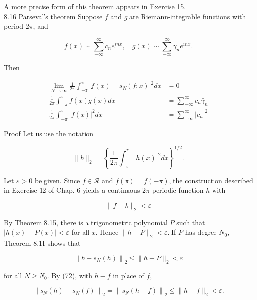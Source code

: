\documentclass[10pt]{article}
\begin{document}
A more precise form of this theorem appears in Exercise 15.\\
8.16 Parseval's theorem Suppose $f$ and $g$ are Riemann-integrable functions with period $2 \pi$, and


\begin{equation*}
f(x) \sim \sum_{-\infty}^{\infty} c_{n} e^{i n x}, \quad g(x) \sim \sum_{-\infty}^{\infty} \gamma_{n} e^{i n x} . \tag{82}
\end{equation*}


Then


\begin{align*}
\lim _{N \rightarrow \infty} \frac{1}{2 \pi} \int_{-\pi}^{\pi}\left|f(x)-s_{N}(f ; x)\right|^{2} d x & =0  \tag{83}\\
\frac{1}{2 \pi} \int_{-\pi}^{\pi} f(x) \overline{g(x)} d x & =\sum_{-\infty}^{\infty} c_{n} \bar{\gamma}_{n}  \tag{84}\\
\frac{1}{2 \pi} \int_{-\pi}^{\pi}|f(x)|^{2} d x & =\sum_{-\infty}^{\infty}\left|c_{n}\right|^{2} \tag{85}
\end{align*}


Proof Let us use the notation


\begin{equation*}
\|h\|_{2}=\left\{\frac{1}{2 \pi} \int_{-\pi}^{\pi}|h(x)|^{2} d x\right\}^{1 / 2} . \tag{86}
\end{equation*}


Let $\varepsilon>0$ be given. Since $f \in \mathscr{R}$ and $f(\pi)=f(-\pi)$, the construction described in Exercise 12 of Chap. 6 yields a continuous $2 \pi$-periodic function $h$ with


\begin{equation*}
\|f-h\|_{2}<\varepsilon \tag{87}
\end{equation*}


By Theorem 8.15, there is a trigonometric polynomial $P$ such that $|h(x)-P(x)|<\varepsilon$ for all $x$. Hence $\|h-P\|_{2}<\varepsilon$. If $P$ has degree $N_{0}$, Theorem 8.11 shows that


\begin{equation*}
\left\|h-s_{N}(h)\right\|_{2} \leq\|h-P\|_{2}<\varepsilon \tag{88}
\end{equation*}


for all $N \geq N_{0}$. By (72), with $h-f$ in place of $f$,


\begin{equation*}
\left\|s_{N}(h)-s_{N}(f)\right\|_{2}=\left\|s_{N}(h-f)\right\|_{2} \leq\|h-f\|_{2}<\varepsilon . \tag{89}
\end{equation*}
\end{document}
